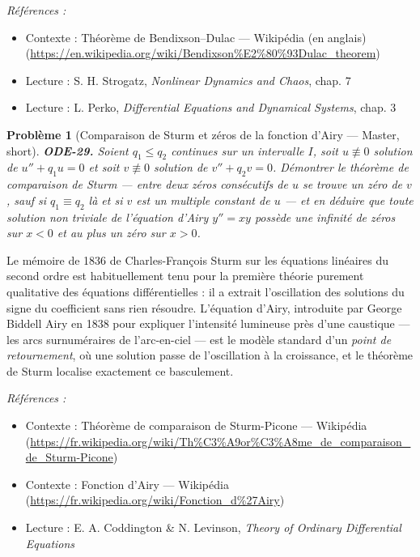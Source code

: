 \documentclass[11pt]{article}
\newtheorem{problem}{Problème}
\newenvironment{refs}{\par\small\noindent\emph{Références :}\begin{itemize}\setlength\itemsep{0pt}}{\end{itemize}\normalsize}
\begin{document}
\begin{refs}
\item Contexte : Théorème de Bendixson--Dulac --- Wikipédia (en anglais) (\url{https://en.wikipedia.org/wiki/Bendixson%E2%80%93Dulac_theorem})
\item Lecture : S. H. Strogatz, \textit{Nonlinear Dynamics and Chaos}, chap. 7
\item Lecture : L. Perko, \textit{Differential Equations and Dynamical Systems}, chap. 3
\end{refs}

\bigskip

\begin{problem}[{Comparaison de Sturm et zéros de la fonction d'Airy --- Master, short}]
\textbf{ODE-29.} Soient $ q_1 \le q_2 $ continues sur un intervalle
$ I $, soit $ u \not\equiv 0 $ solution de $ u'' + q_1 u = 0 $ et soit
$ v \not\equiv 0 $ solution de $ v'' + q_2 v = 0 $. Démontrer le théorème de comparaison de
Sturm --- entre deux zéros consécutifs de $ u $ se trouve un zéro de $ v $, sauf si
$ q_1 \equiv q_2 $ là et si $ v $ est un multiple constant de $ u $ --- et en déduire que
toute solution non triviale de l'équation d'Airy $ y'' = xy $ possède une infinité de zéros sur
$ x <0 $ et au plus un zéro sur $ x >0 $.
\end{problem}

\noindent Le mémoire de 1836 de Charles-François Sturm sur les équations linéaires du
second ordre est habituellement tenu pour la première théorie purement qualitative des équations
différentielles : il a extrait l'oscillation des solutions du signe du coefficient sans rien
résoudre. L'équation d'Airy, introduite par George Biddell Airy en 1838 pour expliquer
l'intensité lumineuse près d'une caustique --- les arcs surnuméraires de l'arc-en-ciel --- est le
modèle standard d'un \textit{point de retournement}, où une solution passe de l'oscillation à la
croissance, et le théorème de Sturm localise exactement ce basculement.

\begin{refs}
\item Contexte : Théorème de comparaison de Sturm-Picone --- Wikipédia (\url{https://fr.wikipedia.org/wiki/Th%C3%A9or%C3%A8me_de_comparaison_de_Sturm-Picone})
\item Contexte : Fonction d'Airy --- Wikipédia (\url{https://fr.wikipedia.org/wiki/Fonction_d%27Airy})
\item Lecture : E. A. Coddington \& N. Levinson, \textit{Theory of Ordinary Differential Equations}
\end{refs}
\end{document}
